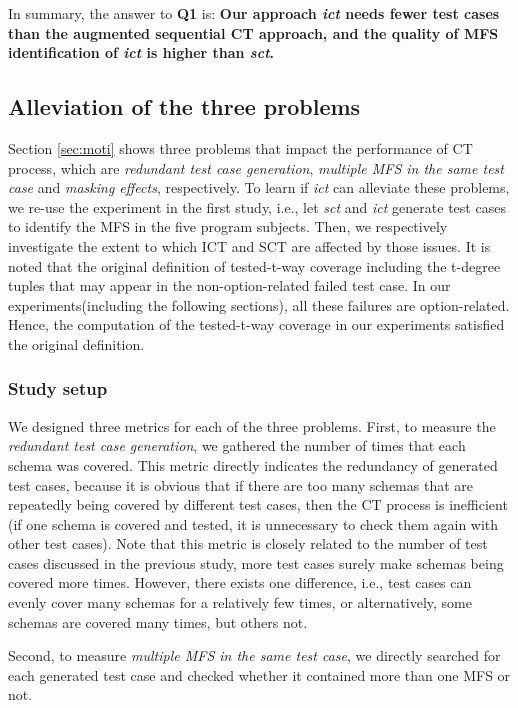 \documentclass[journal,12pt,onecolumn,draftclsnofoot,]{IEEEtran}
\begin{document}
In summary, the answer to \textbf{Q1} is:  \textbf{Our approach \emph{ict} needs fewer test cases than the augmented sequential CT approach, and the quality of MFS identification of \emph{ict} is higher than \emph{sct}.}

\subsection{Alleviation of the three problems}\label{sec:emprical:alleviation}
Section \ref{sec:moti} shows three problems that impact the performance of CT process, which are \emph{redundant test case generation}, \emph{multiple MFS in the same test case} and \emph{masking effects}, respectively. To learn if \emph{ict} can alleviate these problems, we re-use the experiment in the first study, i.e., let \emph{sct} and \emph{ict} generate test cases to identify the MFS in the five program subjects. Then, we respectively investigate the extent to which ICT and SCT are affected by those issues. It is noted that the original definition \cite{yilmaz2013reducing} of tested-t-way coverage including the t-degree tuples that may appear in the non-option-related failed test case. In our experiments(including the following sections), all these failures are option-related. Hence, the computation of the tested-t-way coverage in our experiments satisfied the original definition.

\subsubsection{Study setup}
We designed three metrics for each of the three problems. First, to measure the \emph{redundant test case generation}, we gathered the number of times that each schema was covered. This metric directly indicates the redundancy of generated test cases, because it is obvious that if there are too many schemas that are repeatedly being covered by different test cases, then the CT process is inefficient (if one schema is covered and tested, it is unnecessary to check them again with other test cases). Note that this metric is closely related to the number of test cases discussed in the previous study, more test cases surely make schemas being covered more times. However, there exists one difference, i.e., test cases can evenly cover many schemas for a relatively few times, or alternatively, some schemas are covered many times, but others not.

Second, to measure \emph{multiple MFS in the same test case}, we directly searched for each generated test case and checked whether it contained more than one MFS or not.
\end{document}
